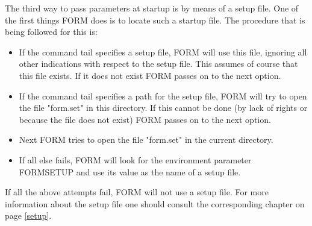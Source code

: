 The third way to pass parameters at startup is by means of a setup 
file. 
One of the first things FORM does is to locate such a startup file. The 
procedure that is being followed for this is:
\begin{itemize}
\item If the command tail specifies a setup file, FORM will use this file, 
ignoring all other indications with respect to the setup file. This assumes 
of course that this file exists. If it does not exist FORM passes on to the 
next option.
\item If the command tail specifies a path for the setup file, FORM will 
try to open the file "form.set" in this directory. If this cannot be done 
(by lack of rights or because the file does not exist) FORM passes on to 
the next option.
\item Next FORM tries to open the file "form.set" in the 
current directory.\item If all else fails, FORM will look for the 
environment parameter FORMSETUP and use its value as the name of a setup 
file.
\end{itemize}
If all the above attempts fail, FORM will not use a setup file. For more 
information about the setup file one should consult the corresponding 
chapter on page \ref{setup}.
